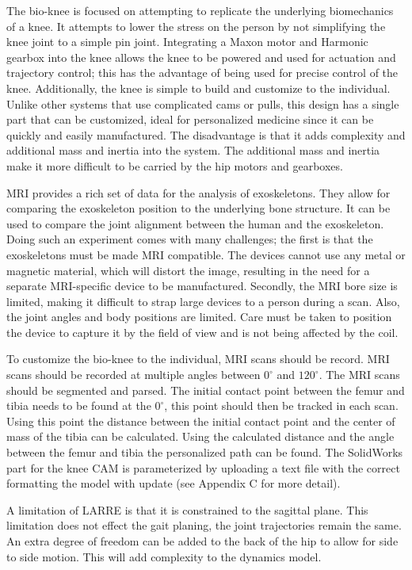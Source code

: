 The bio-knee is focused on attempting to replicate the underlying biomechanics of a knee. It attempts to lower the stress on the person by not simplifying the knee joint to a simple pin joint. Integrating a Maxon motor and Harmonic gearbox into the knee allows the knee to be powered and used for actuation and trajectory control; this has the advantage of being used for precise control of the knee. Additionally, the knee is simple to build and customize to the individual. Unlike other systems that use complicated cams or pulls, this design has a single part that can be customized, ideal for personalized medicine since it can be quickly and easily manufactured. The disadvantage is that it adds complexity and additional mass and inertia into the system. The additional mass and inertia make it more difficult to be carried by the hip motors and gearboxes.

MRI provides a rich set of data for the analysis of exoskeletons. They allow for comparing the exoskeleton position to the underlying bone structure. It can be used to compare the joint alignment between the human and the exoskeleton. Doing such an experiment comes with many challenges; the first is that the exoskeletons must be made MRI compatible. The devices cannot use any metal or magnetic material, which will distort the image, resulting in the need for a separate MRI-specific device to be manufactured. Secondly, the MRI bore size is limited, making it difficult to strap large devices to a person during a scan. Also, the joint angles and body positions are limited. Care must be taken to position the device to capture it by the field of view and is not being affected by the coil. 

To customize the bio-knee to the individual, MRI scans should be record. MRI scans should be recorded at multiple angles between $0^{\circ}$ and $120^{\circ}$. The MRI scans should be segmented and parsed. The initial contact point between the femur and tibia needs to be found at the $0^{\circ}$, this point should then be tracked in each scan. Using this point the distance between the initial contact point and the center of mass of the tibia can be calculated. Using the calculated distance and the angle between the femur and tibia the personalized path can be found. The SolidWorks part for the knee CAM is parameterized by uploading a text file with the correct formatting the model with update (see Appendix C for more detail). 

A limitation of LARRE is that it is constrained to the sagittal plane. This limitation does not effect the gait planing, the joint trajectories remain the same. An extra degree of freedom can be added to the back of the hip to allow for side to side motion. This will add complexity to the dynamics model.   

